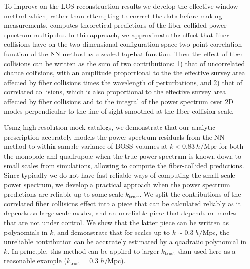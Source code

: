 To improve on the LOS reconstruction results we develop the effective window method which, rather than attempting to correct the data before making measurements, computes theoretical predictions of the fiber-collided power spectrum multipoles.
In this approach, we approximate the effect that 
fiber collisions have on the two-dimensional configuration space two-point 
correlation function of the NN method as a scaled top-hat function. 
Then the effect of fiber collisions can be written as the sum of two contributions: 1) that of uncorrelated chance collisions, with an amplitude proportional to the 
the effective survey area affected by fiber collisions times the wavelength of perturbations, and 2) that of correlated collisions, which is also proportional to the effective survey area affected by fiber collisions and to the integral of the power spectrum over 2D modes perpendicular to the line of sight smoothed at the fiber collision scale.

Using high resolution mock catalogs, we demonstrate that our  analytic prescription 
accurately models the power spectrum residuals from the NN method to within sample variance of BOSS volumes  
at $k < 0.83\;h/\mathrm{Mpc}$ for both the monopole and quadrupole when the true power spectrum is known down to small scales from simulations, allowing to compute the fiber-collided predictions. Since typically we do not have fast reliable ways of computing the small scale power spectrum, we develop a practical approach when the power spectrum predictions are reliable up to some scale $k_\mathrm{trust}$. We split the contributions of the correlated fiber collisions effect into a  piece that can be calculated reliably as it depends on large-scale modes, and an unreliable piece that depends on modes that are not under control. We show that the latter piece can be written as polynomials in $k$, and demonstrate that for scales up to $k \sim 0.3\;h/\mathrm{Mpc}$, the unreliable contribution can be accurately estimated by a quadratic  polynomial in $k$. In principle, this method can be applied to larger $k_\mathrm{trust}$ than used here as a reasonable example ($k_\mathrm{trust} = 0.3\;h/\mathrm{Mpc}$). 

